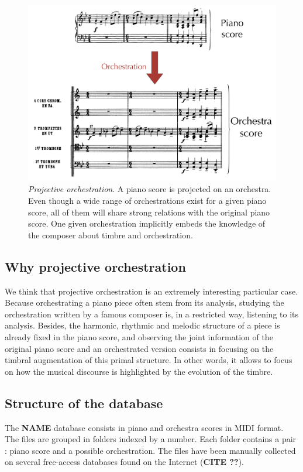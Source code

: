 \documentclass[twoside,twocolumn]{article}
\begin{document}
\begin{figure}
\centering
\includegraphics[scale=0.12]{orch}
\caption{\textit{Projective orchestration}. A piano score is projected on an orchestra. Even though a wide range of orchestrations exist for a given piano score, all of them will share strong relations with the original piano score. One given orchestration implicitly embeds the knowledge of the composer about timbre and orchestration.}
\label{fig:orch}
\end{figure}

\subsection{Why projective orchestration}
We think that projective orchestration is an extremely interesting particular case. Because orchestrating a piano piece often stem from its analysis, studying the orchestration written by a famous composer is, in a restricted way, listening to its analysis. Besides, the harmonic, rhythmic and melodic structure of a piece is already fixed in the piano score, and observing the joint information of the original piano score and an orchestrated version consists in focusing on the timbral augmentation of this primal structure. In other words, it allows to focus on how the musical discourse is highlighted by the evolution of the timbre.

\subsection{Structure of the database}
The \textbf{NAME} database consists in piano and orchestra scores in MIDI format.
The files are grouped in folders indexed by a number. Each folder contains a pair : piano score and a possible orchestration. 
The files have been manually collected on several free-access databases found on the Internet (\textbf{CITE ??}).
\end{document}
